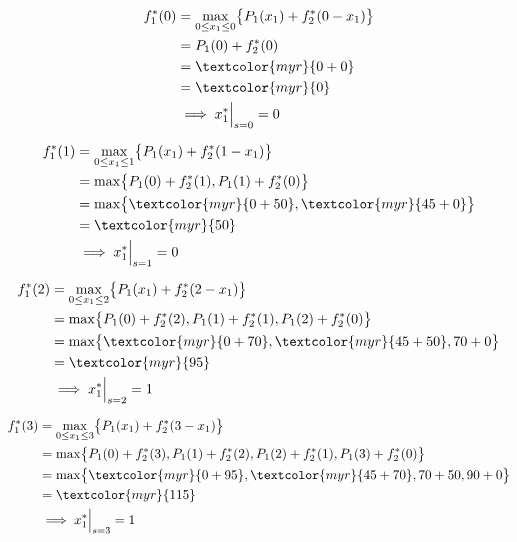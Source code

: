 \documentclass{report}
\begin{document}
\begin{align*}
    f_1^{*}(0) &= \max_{0 \leq x_1 \leq 0} \bigl\{ P_1(x_1) + f_2^{*}(0 - x_1) \bigr\} \\
               &= P_1(0) + f_2^{*}(0) \\
               &= \textcolor{myr}{0 + 0} \\
               &= \textcolor{myr}{0} \\
               &\implies x_1^{*}\Big|_{s = 0} = 0
\end{align*}

\begin{align*}
    f_1^{*}(1) &= \max_{0 \leq x_1 \leq 1} \bigl\{ P_1(x_1) + f_2^{*}(1 - x_1) \bigr\} \\
               &= \max \bigl\{ P_1(0) + f_2^{*}(1), P_1(1) + f_2^{*}(0) \bigr\} \\
               &= \max \bigl\{ \textcolor{myr}{0 + 50}, \textcolor{myr}{45 + 0} \bigr\} \\
               &= \textcolor{myr}{50} \\
               &\implies x_1^{*}\Big|_{s = 1} = 0
\end{align*}

\begin{align*}
    f_1^{*}(2) &= \max_{0 \leq x_1 \leq 2} \bigl\{ P_1(x_1) + f_2^{*}(2 - x_1) \bigr\} \\
               &= \max \bigl\{ P_1(0) + f_2^{*}(2), P_1(1) + f_2^{*}(1), P_1(2) + f_2^{*}(0) \bigr\} \\
               &= \max \bigl\{ \textcolor{myr}{0 + 70}, \textcolor{myr}{45 + 50}, 70 + 0 \bigr\} \\
               &= \textcolor{myr}{95} \\
               &\implies x_1^{*}\Big|_{s = 2} = 1
\end{align*}

\begin{align*}
    f_1^{*}(3) &= \max_{0 \leq x_1 \leq 3} \bigl\{ P_1(x_1) + f_2^{*}(3 - x_1) \bigr\} \\
               &= \max \bigl\{ P_1(0) + f_2^{*}(3), P_1(1) + f_2^{*}(2), P_1(2) + f_2^{*}(1), P_1(3) + f_2^{*}(0) \bigr\} \\
               &= \max \bigl\{ \textcolor{myr}{0 + 95}, \textcolor{myr}{45 + 70}, 70 + 50, 90 + 0 \bigr\} \\
               &= \textcolor{myr}{115} \\
               &\implies x_1^{*}\Big|_{s = 3} = 1
\end{align*}
\end{document}
